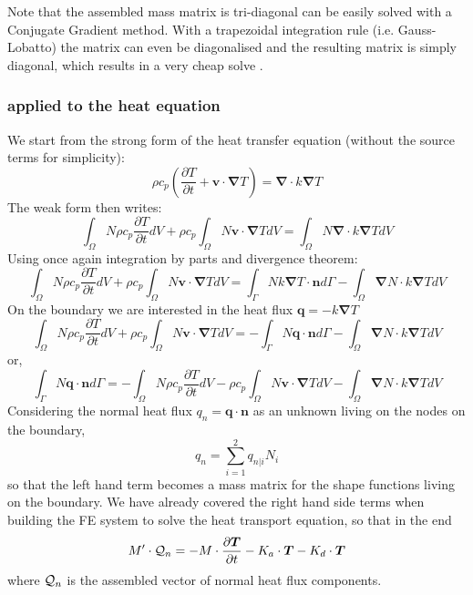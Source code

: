 Note that the assembled mass matrix is tri-diagonal can be easily solved with 
a Conjugate Gradient method. With a trapezoidal integration rule 
(i.e. Gauss-Lobatto) the matrix can even be diagonalised and the resulting 
matrix is simply diagonal, which results in a very cheap solve \cite{zhgh93}.

\subsubsection{applied to the heat equation}
We start from the strong form of the heat transfer equation (without the source terms for simplicity):
\[
\rho c_p
\left(\frac{\partial T}{\partial t} + {\bm v}\cdot {\bm \nabla}T\right)
=
{\bm \nabla} \cdot k{\bm \nabla T}
\]
The weak form then writes:
\[
\int_\Omega N
\rho c_p
\frac{\partial T}{\partial t} dV 
+
\rho c_p
\int_\Omega N
 {\bm v}\cdot {\bm \nabla}T  dV
=
\int_\Omega N
{\bm \nabla} \cdot k{\bm \nabla T} dV
\]
Using once again integration by parts and divergence theorem:
\[
\int_\Omega N
\rho c_p
\frac{\partial T}{\partial t} dV 
+
\rho c_p
\int_\Omega N
 {\bm v}\cdot {\bm \nabla}T  dV
=
\int_\Gamma N k {\bm \nabla T} \cdot {\bm n} d\Gamma
-
\int_\Omega  {\bm \nabla} N \cdot k{\bm \nabla T} dV
\]
On the boundary we are interested in the heat flux ${\bm q}=-k {\bm \nabla T}$
\[
\int_\Omega N
\rho c_p
\frac{\partial T}{\partial t} dV 
+
\rho c_p
\int_\Omega N
 {\bm v}\cdot {\bm \nabla}T  dV
=
-\int_\Gamma N {\bm q} \cdot {\bm n} d\Gamma
- \int_\Omega  {\bm \nabla} N \cdot k{\bm \nabla T} dV
\]
or,
\[
\int_\Gamma N {\bm q} \cdot {\bm n} d\Gamma
=
-\int_\Omega N
\rho c_p
\frac{\partial T}{\partial t} dV 
-\rho c_p
\int_\Omega N
 {\bm v}\cdot {\bm \nabla}T  dV
- \int_\Omega  {\bm \nabla} N \cdot k{\bm \nabla T} dV
\]
Considering the normal heat flux $q_n = {\bm q} \cdot {\bm n}$ as an unknown 
living on the nodes on the boundary, 
\[
q_n = \sum_{i=1}^2 q_{n|i} N_i
\]
so that the left hand term becomes a mass matrix for the shape functions living on 
the boundary.
We have already covered the right hand side terms when building the FE system 
to solve the heat transport equation, so that in the end 
\[
M' \cdot {\cal Q}_n =
- M \cdot \frac{\partial \bm T}{\partial t} -K_a \cdot {\bm T} - K_d \cdot {\bm T} 
\]
where ${\cal Q}_n$ is the assembled vector of normal heat flux components.

